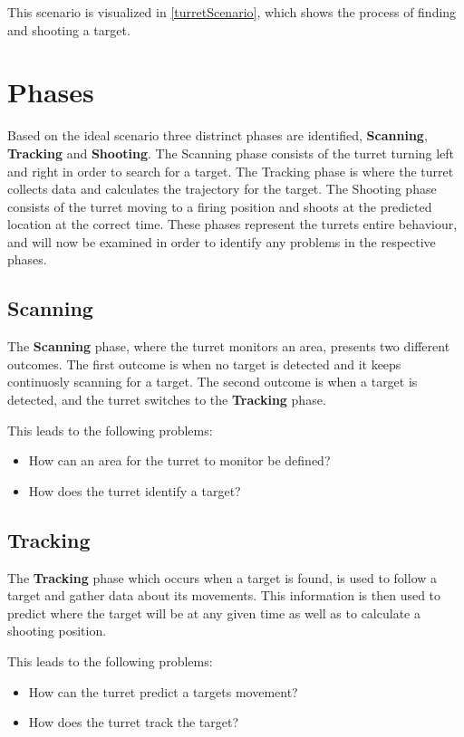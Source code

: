 This scenario is visualized in \autoref{turretScenario}, which shows the process
of finding and shooting a target.


\section{Phases}
Based on the ideal scenario three distrinct phases are identified,
\textbf{Scanning}, \textbf{Tracking} and \textbf{Shooting}. The Scanning phase
consists of the turret turning left and right in order to search for a target.
The Tracking phase is where the turret collects data and calculates the
trajectory for the target. The Shooting phase consists of the turret moving to
a firing position and shoots at the predicted location at the correct time.
These phases represent the turrets entire behaviour, and will now be examined in
order to identify any problems in the respective phases.

\subsection{Scanning}
The \textbf{Scanning} phase, where the turret monitors an area, presents two
different outcomes. The first outcome is when no target is detected and it
keeps continuosly scanning for a target. The second outcome is when a target
is detected, and the turret switches to the \textbf{Tracking} phase.\nl

This leads to the following problems:
\begin{itemize}
  \item How can an area for the turret to monitor be defined?
  \item How does the turret identify a target?
\end{itemize}

\subsection{Tracking}
The \textbf{Tracking} phase which occurs when a target is found, is used to
follow a target and gather data about its movements. This information is then used to
predict where the target will be at any given time as well as to calculate a
shooting position.\nl

This leads to the following problems:
\begin{itemize}
  \item How can the turret predict a targets movement?
  \item How does the turret track the target?
\end{itemize}


